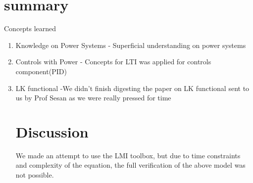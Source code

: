 \documentclass[journal]{IEEEtran}
\begin{document}
\section{summary}
Concepts learned
\begin{enumerate}
  \item Knowledge on Power Systems - Superficial understanding on power systems
  \item Controls with Power - Concepts for LTI was applied for controls component(PID)
  \item LK functional -We didn't finish digesting the paper on LK functional sent to us by Prof Sesan as we were really pressed for time

\section{Discussion}
We made an attempt to use the LMI toolbox, but due to time constraints and complexity of the equation,  the full verification of the above model was not possible.





%



\end{enumerate}
\end{document}
